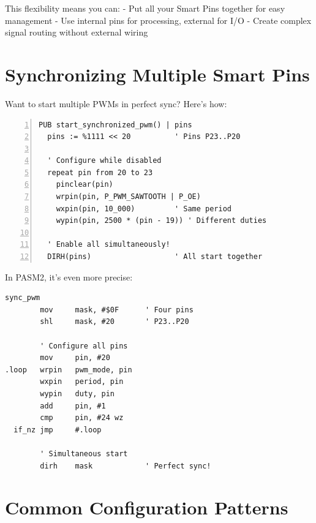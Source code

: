 \documentclass[11pt,a4paper,oneside,english]{book}
\begin{document}
This flexibility means you can: - Put all your Smart Pins together for
easy management - Use internal pins for processing, external for I/O -
Create complex signal routing without external wiring

\hypertarget{synchronizing-multiple-smart-pins}{%
\section{Synchronizing Multiple Smart
Pins}\label{synchronizing-multiple-smart-pins}}

Want to start multiple PWMs in perfect sync? Here's how:

\begin{Spin2Block}
\begin{Verbatim}[numbers=left,numbersep=5pt,xleftmargin=15pt]
PUB start_synchronized_pwm() | pins
  pins := %1111 << 20          ' Pins P23..P20
  
  ' Configure while disabled
  repeat pin from 20 to 23
    pinclear(pin)
    wrpin(pin, P_PWM_SAWTOOTH | P_OE)
    wxpin(pin, 10_000)         ' Same period
    wypin(pin, 2500 * (pin - 19)) ' Different duties
    
  ' Enable all simultaneously!
  DIRH(pins)                   ' All start together
\end{Verbatim}
\end{Spin2Block}

In PASM2, it's even more precise:

\begin{PASM2Block}
\begin{lstlisting}
sync_pwm
        mov     mask, #$0F      ' Four pins
        shl     mask, #20       ' P23..P20
        
        ' Configure all pins
        mov     pin, #20
.loop   wrpin   pwm_mode, pin
        wxpin   period, pin
        wypin   duty, pin
        add     pin, #1
        cmp     pin, #24 wz
  if_nz jmp     #.loop
  
        ' Simultaneous start
        dirh    mask            ' Perfect sync!
\end{lstlisting}
\end{PASM2Block}

\hypertarget{common-configuration-patterns}{%
\section{Common Configuration
Patterns}\label{common-configuration-patterns}}
\end{document}
